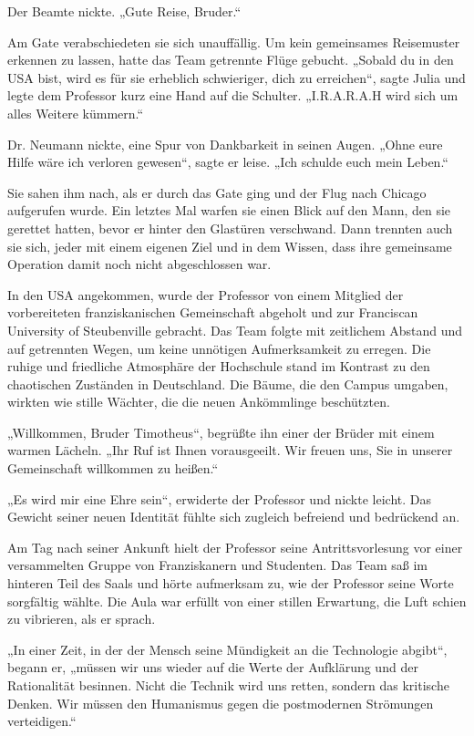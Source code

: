 \documentclass[
]{article}
\begin{document}
Der Beamte nickte. „Gute Reise, Bruder.“

Am Gate verabschiedeten sie sich unauffällig. Um kein gemeinsames Reisemuster erkennen zu lassen, hatte das Team getrennte Flüge gebucht. „Sobald du in den USA bist, wird es für sie erheblich schwieriger, dich zu erreichen“, sagte Julia und legte dem Professor kurz eine Hand auf die Schulter. „I.R.A.R.A.H wird sich um alles Weitere kümmern.“

Dr. Neumann nickte, eine Spur von Dankbarkeit in seinen Augen. „Ohne eure Hilfe wäre ich verloren gewesen“, sagte er leise. „Ich schulde euch mein Leben.“

Sie sahen ihm nach, als er durch das Gate ging und der Flug nach Chicago aufgerufen wurde. Ein letztes Mal warfen sie einen Blick auf den Mann, den sie gerettet hatten, bevor er hinter den Glastüren verschwand. Dann trennten auch sie sich, jeder mit einem eigenen Ziel und in dem Wissen, dass ihre gemeinsame Operation damit noch nicht abgeschlossen war.

In den USA angekommen, wurde der Professor von einem Mitglied der vorbereiteten franziskanischen Gemeinschaft abgeholt und zur Franciscan University of Steubenville gebracht. Das Team folgte mit zeitlichem Abstand und auf getrennten Wegen, um keine unnötigen Aufmerksamkeit zu erregen. Die ruhige und friedliche Atmosphäre der Hochschule stand im Kontrast zu den chaotischen Zuständen in Deutschland. Die Bäume, die den Campus umgaben, wirkten wie stille Wächter, die die neuen Ankömmlinge beschützten.

„Willkommen, Bruder Timotheus“, begrüßte ihn einer der Brüder mit einem warmen Lächeln. „Ihr Ruf ist Ihnen vorausgeeilt. Wir freuen uns, Sie in unserer Gemeinschaft willkommen zu heißen.“

„Es wird mir eine Ehre sein“, erwiderte der Professor und nickte leicht. Das Gewicht seiner neuen Identität fühlte sich zugleich befreiend und bedrückend an.

Am Tag nach seiner Ankunft hielt der Professor seine Antrittsvorlesung vor einer versammelten Gruppe von Franziskanern und Studenten. Das Team saß im hinteren Teil des Saals und hörte aufmerksam zu, wie der Professor seine Worte sorgfältig wählte. Die Aula war erfüllt von einer stillen Erwartung, die Luft schien zu vibrieren, als er sprach.

„In einer Zeit, in der der Mensch seine Mündigkeit an die Technologie abgibt``, begann er, „müssen wir uns wieder auf die Werte der Aufklärung und der Rationalität besinnen. Nicht die Technik wird uns retten, sondern das kritische Denken. Wir müssen den Humanismus gegen die postmodernen Strömungen verteidigen.``
\end{document}
